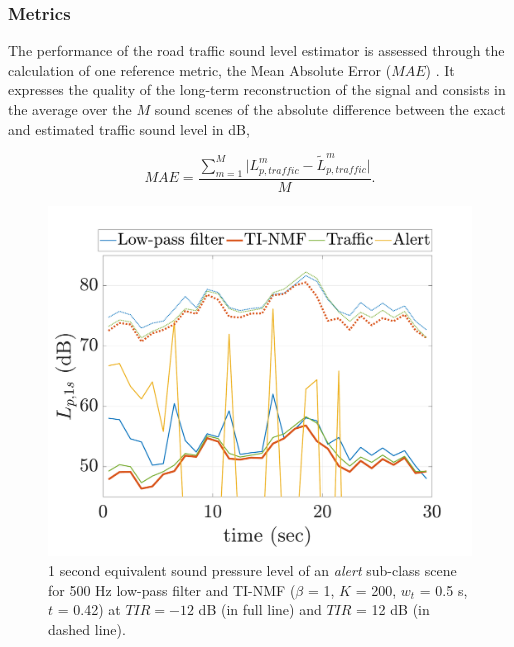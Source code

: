 \documentclass[twocolumn]{svjour3}          %
\begin{document}
\subsubsection{Metrics}

The performance of the road traffic sound level estimator is assessed through the calculation of one reference metric, the Mean Absolute Error ($MAE$) \cite{willmott2005advantages}. It expresses the quality of the long-term reconstruction of the signal and consists in the average over the $M$ sound scenes of the absolute difference between the exact and estimated traffic sound level in dB,

\begin{equation}
MAE = \frac{\sum_{m = 1}^M\vert L^m_{p,traffic}-\tilde{L}^m_{p,traffic} \vert}{M}.
\end{equation}

\begin{figure}[t]
  \centering
	\includegraphics[width=\textwidth]{figures/NMF_Lp_alert.pdf}
 \caption{1 second equivalent sound pressure level of an \textit{alert} sub-class scene for 500 Hz low-pass filter and TI-NMF ($\beta$ = 1, $K$ = 200, $w_t$ = 0.5 s, $t$ = 0.42) at $TIR = -12$ dB (in full line) and $TIR$ = 12 dB (in dashed line).}
	\label{fig:lp_alert}
\end{figure}
\end{document}
